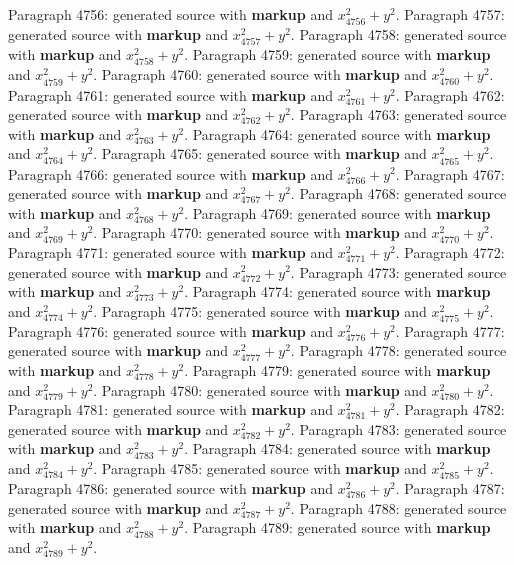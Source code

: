 \documentclass{article}
\begin{document}
Paragraph 4756: generated source with \textbf{markup} and $x_{4756}^2 + y^2$.
Paragraph 4757: generated source with \textbf{markup} and $x_{4757}^2 + y^2$.
Paragraph 4758: generated source with \textbf{markup} and $x_{4758}^2 + y^2$.
Paragraph 4759: generated source with \textbf{markup} and $x_{4759}^2 + y^2$.
Paragraph 4760: generated source with \textbf{markup} and $x_{4760}^2 + y^2$.
Paragraph 4761: generated source with \textbf{markup} and $x_{4761}^2 + y^2$.
Paragraph 4762: generated source with \textbf{markup} and $x_{4762}^2 + y^2$.
Paragraph 4763: generated source with \textbf{markup} and $x_{4763}^2 + y^2$.
Paragraph 4764: generated source with \textbf{markup} and $x_{4764}^2 + y^2$.
Paragraph 4765: generated source with \textbf{markup} and $x_{4765}^2 + y^2$.
Paragraph 4766: generated source with \textbf{markup} and $x_{4766}^2 + y^2$.
Paragraph 4767: generated source with \textbf{markup} and $x_{4767}^2 + y^2$.
Paragraph 4768: generated source with \textbf{markup} and $x_{4768}^2 + y^2$.
Paragraph 4769: generated source with \textbf{markup} and $x_{4769}^2 + y^2$.
Paragraph 4770: generated source with \textbf{markup} and $x_{4770}^2 + y^2$.
Paragraph 4771: generated source with \textbf{markup} and $x_{4771}^2 + y^2$.
Paragraph 4772: generated source with \textbf{markup} and $x_{4772}^2 + y^2$.
Paragraph 4773: generated source with \textbf{markup} and $x_{4773}^2 + y^2$.
Paragraph 4774: generated source with \textbf{markup} and $x_{4774}^2 + y^2$.
Paragraph 4775: generated source with \textbf{markup} and $x_{4775}^2 + y^2$.
Paragraph 4776: generated source with \textbf{markup} and $x_{4776}^2 + y^2$.
Paragraph 4777: generated source with \textbf{markup} and $x_{4777}^2 + y^2$.
Paragraph 4778: generated source with \textbf{markup} and $x_{4778}^2 + y^2$.
Paragraph 4779: generated source with \textbf{markup} and $x_{4779}^2 + y^2$.
Paragraph 4780: generated source with \textbf{markup} and $x_{4780}^2 + y^2$.
Paragraph 4781: generated source with \textbf{markup} and $x_{4781}^2 + y^2$.
Paragraph 4782: generated source with \textbf{markup} and $x_{4782}^2 + y^2$.
Paragraph 4783: generated source with \textbf{markup} and $x_{4783}^2 + y^2$.
Paragraph 4784: generated source with \textbf{markup} and $x_{4784}^2 + y^2$.
Paragraph 4785: generated source with \textbf{markup} and $x_{4785}^2 + y^2$.
Paragraph 4786: generated source with \textbf{markup} and $x_{4786}^2 + y^2$.
Paragraph 4787: generated source with \textbf{markup} and $x_{4787}^2 + y^2$.
Paragraph 4788: generated source with \textbf{markup} and $x_{4788}^2 + y^2$.
Paragraph 4789: generated source with \textbf{markup} and $x_{4789}^2 + y^2$.
\end{document}
